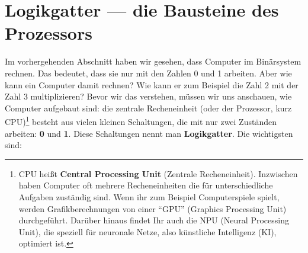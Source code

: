 \section{Logikgatter — die Bausteine des Prozessors}
\label{sec:grundlagen:logikgatter}

Im vorhergehenden Abschnitt haben wir gesehen, dass Computer im Binärsystem rechnen. Das bedeutet, dass sie nur mit den Zahlen 0 und 1 arbeiten. Aber wie kann ein Computer damit rechnen? Wie kann er zum Beispiel die Zahl 2 mit der Zahl 3 multiplizieren? Bevor wir das verstehen, müssen wir uns anschauen, wie Computer aufgebaut sind: die zentrale Recheneinheit (oder der Prozessor, kurz CPU)\footnote{%
  CPU heißt \textbf{Central Processing Unit} (Zentrale Recheneinheit). Inzwischen haben Computer oft mehrere Recheneinheiten die für unterschiedliche Aufgaben zuständig sind. Wenn ihr zum Beispiel Computerspiele spielt, werden Grafikberechnungen von einer ``GPU'' (Graphics Processing Unit) durchgeführt. Darüber hinaus findet Ihr auch die NPU (Neural Processing Unit), die speziell für neuronale Netze, also  künstliche Intelligenz (KI), optimiert ist.}
besteht aus vielen kleinen Schaltungen, die mit nur zwei Zuständen arbeiten: \textbf{0} und \textbf{1}. Diese Schaltungen nennt man \textbf{Logikgatter}. Die wichtigsten sind:
